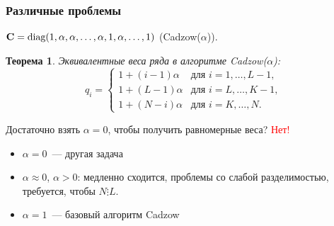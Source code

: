 \documentclass[unicode, notheorems]{beamer}
\newtheorem{theorem}{Теорема}
\begin{document}
\begin{frame}
	\frametitle{Различные проблемы}
	 $\mathbf{C} = \text{diag}(1, \alpha, \alpha, \ldots, \alpha, 1, \alpha, \ldots, 1)$ (Cadzow($\alpha$)).
	\begin{theorem}
		Эквивалентные веса ряда в алгоритме Cadzow($\alpha$):
		\begin{equation*}
		q_i = \begin{cases}
		1 + (i - 1) \alpha & \text{для $i = 1, \ldots, L-1,$}\\
		1 + (L - 1) \alpha & \text{для $i = L, \ldots, K-1,$}\\
		1 + (N - i) \alpha & \text{для $i = K, \ldots, N.$}
		\end{cases}
	    \end{equation*}
	\end{theorem}
	
	Достаточно взять $\alpha = 0$, чтобы получить равномерные веса? \textcolor{red}{Нет!}
	\begin{itemize}
		\item  $\alpha = 0$~--- другая задача
		\item $\alpha \approx 0$, $\alpha > 0$: медленно сходится, проблемы со слабой разделимостью, требуется, чтобы $N \vdots L$.
		\item $\alpha = 1$~--- базовый алгоритм Cadzow
	\end{itemize}

\end{frame}

\end{document}
